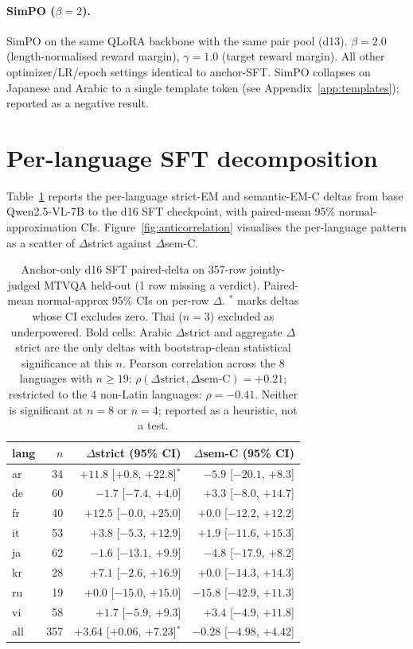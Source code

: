 \paragraph{SimPO ($\beta = 2$).}
SimPO \citep{meng2024simpo} on the same QLoRA backbone with the same pair pool (d13). $\beta = 2.0$ (length-normalised reward margin), $\gamma = 1.0$ (target reward margin). All other optimizer/LR/epoch settings identical to anchor-SFT. SimPO collapses on Japanese and Arabic to a single template token (see Appendix~\ref{app:templates}); reported as a negative result.

\section{Per-language SFT decomposition}
\label{app:sft-perlang}

Table~\ref{tab:sft-perlang} reports the per-language strict-EM and semantic-EM-C deltas from base Qwen2.5-VL-7B to the d16 SFT checkpoint, with paired-mean 95\% normal-approximation CIs. Figure~\ref{fig:anticorrelation} visualises the per-language pattern as a scatter of $\Delta$strict against $\Delta$sem-C.

\begin{table}[t]
\centering
\scriptsize
\setlength{\tabcolsep}{3pt}
\begin{tabular}{@{}lrrr@{}}
\toprule
lang & $n$ & $\Delta$strict (95\% CI) & $\Delta$sem-C (95\% CI) \\
\midrule
ar & 34 & $\bm{+11.8}$ [$+0.8$, $+22.8$]$^*$ & $-5.9$ [$-20.1$, $+8.3$] \\
de & 60 & $-1.7$ [$-7.4$, $+4.0$] & $+3.3$ [$-8.0$, $+14.7$] \\
fr & 40 & $+12.5$ [$-0.0$, $+25.0$] & $+0.0$ [$-12.2$, $+12.2$] \\
it & 53 & $+3.8$ [$-5.3$, $+12.9$] & $+1.9$ [$-11.6$, $+15.3$] \\
ja & 62 & $-1.6$ [$-13.1$, $+9.9$] & $-4.8$ [$-17.9$, $+8.2$] \\
kr & 28 & $+7.1$ [$-2.6$, $+16.9$] & $+0.0$ [$-14.3$, $+14.3$] \\
ru & 19 & $+0.0$ [$-15.0$, $+15.0$] & $-15.8$ [$-42.9$, $+11.3$] \\
vi & 58 & $+1.7$ [$-5.9$, $+9.3$] & $+3.4$ [$-4.9$, $+11.8$] \\
\midrule
all & 357 & $\bm{+3.64}$ [$+0.06$, $+7.23$]$^*$ & $-0.28$ [$-4.98$, $+4.42$] \\
\bottomrule
\end{tabular}
\caption{Anchor-only d16 SFT paired-delta on 357-row jointly-judged MTVQA held-out (1 row missing a verdict). Paired-mean normal-approx 95\% CIs on per-row $\Delta$. $^*$ marks deltas whose CI excludes zero. Thai ($n=3$) excluded as underpowered. Bold cells: Arabic $\Delta$strict and aggregate $\Delta$strict are the only deltas with bootstrap-clean statistical significance at this $n$. Pearson correlation across the 8 languages with $n\geq 19$: $\rho(\Delta\text{strict}, \Delta\text{sem-C}) = +0.21$; restricted to the 4 non-Latin languages: $\rho = -0.41$. Neither is significant at $n=8$ or $n=4$; reported as a heuristic, not a test.}
\label{tab:sft-perlang}
\end{table}

